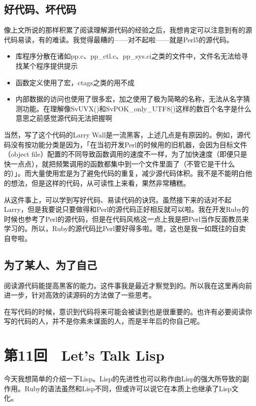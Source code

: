 \documentclass[a4paper,12pt]{article}
\begin{document}
\subsection{好代码、坏代码}

像上文所说的那样积累了阅读理解源代码的经验之后，我想肯定可以注意到有的源代码易读，有的难读。我觉得最糟的——对不起啦——就是Perl5的源代码。
\begin{itemize}
\item 库程序分散在诸如pp.c、pp\_ctl.c、pp\_sys.ci之类的文件中，文件名无法给寻找某个程序提供提示
\item 函数定义使用了宏，ctags之类的用不成
\item 内部数据的访问也使用了很多宏，加之使用了极为简略的名称，无法从名字猜测功能。在理解像SvUVX()和SvPOK\_only\_UTF8()这样的数百个名字是什么意思之前感觉源代码无法把握啊
\end{itemize}
当然，写了这个代码的Larry Wall是一流黑客，上述几点是有原因的。例如，源代码没有按功能分类是因为，「在当初开发Perl的时候用的旧机器，会因为目标文件（object file）配置的不同导致函数调用的速度不一样，为了加快速度（即便只是快一点点），就把频繁调用的函数都集中到一个文件里面了（不管它是干什么的）」。而大量使用宏是为了避免代码的重复，减少源代码体积。我不是不能明白他的想法，但是这样的代码，从可读性上来看，果然非常糟糕。

从这件事上，可以学到写好代码、易读代码的诀窍。虽然接下来的话对不起Larry，但是我要说只要做得和Perl的源代码正好相反就可以啦。我在开发Ruby的时候也参考了Perl的源代码，但是在代码风格这一点上我是把Perl当作反面教员来学习的。所以，Ruby的源代码比Perl要好得多啦。嗯，这也是我一如既往的自卖自夸啦。

\subsection{为了某人、为了自己}

阅读源代码能提高黑客的能力。这件事我是最近才察觉到的。所以我在这里再向前进一步，针对高效的读源码的方法做了一些思考。

在写代码的时候，意识到代码将来可能会被读到也是很重要的。也许有必要阅读你写的代码的人，并不是你素未谋面的人，而是半年后的你自己呢。


\section{第11回　Let's Talk Lisp}

今天我想简单的介绍一下Lisp。Lisp的先进性也可以称作由Lisp的强大所导致的副作用。Ruby的语法虽然和Lisp不同，但或许可以说它在本质上也继承了Lisp文化。
\end{document}
